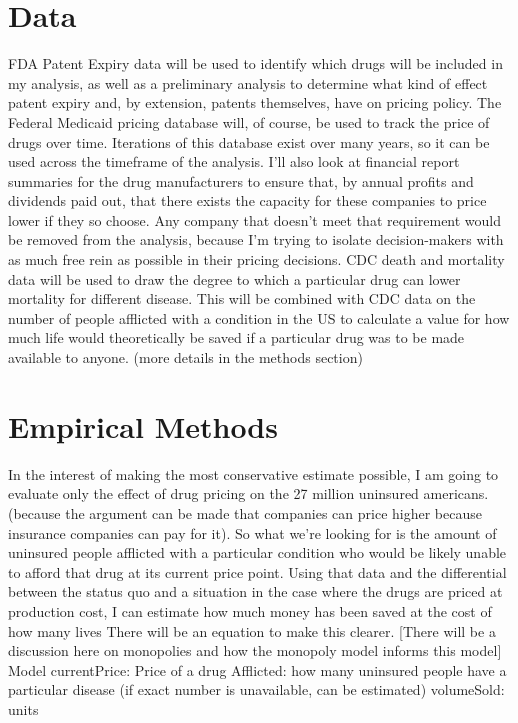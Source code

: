 \documentclass[12pt,english]{article} \usepackage{mathptmx}
\begin{document}
\section{Data}\label{sec:data} FDA Patent Expiry data will be used to 
identify which drugs will be included in my analysis, as well as a 
preliminary analysis to determine what kind of effect patent expiry 
and, by extension, patents themselves, have on pricing policy. The 
Federal Medicaid pricing database will, of course, be used to track 
the price of drugs over time. Iterations of this database exist over 
many years, so it can be used across the timeframe of the analysis. 
I'll also look at financial report summaries for the drug 
manufacturers to ensure that, by annual profits and dividends paid 
out, that there exists the capacity for these companies to price 
lower if they so choose. Any company that doesn't meet that 
requirement would be removed from the analysis, because I'm trying to 
isolate decision-makers with as much free rein as possible in their 
pricing decisions. CDC death and mortality data will be used to draw 
the degree to which a particular drug can lower mortality for 
different disease. This will be combined with CDC data on the number 
of people afflicted with a condition in the US to calculate a value 
for how much life would theoretically be saved if a particular drug 
was to be made available to anyone. (more details in the methods 
section) \section{Empirical Methods}\label{sec:methods} In the 
interest of making the most conservative estimate possible, I am 
going to evaluate only the effect of drug pricing on the 27 million 
uninsured americans. (because the argument can be made that companies 
can price higher because insurance companies can pay for it). So what 
we're looking for is the amount of uninsured people afflicted with a 
particular condition who would be likely unable to afford that drug 
at its current price point. Using that data and the differential 
between the status quo and a situation in the case where the drugs 
are priced at production cost, I can estimate how much money has been 
saved at the cost of how many lives There will be an equation to make 
this clearer. [There will be a discussion here on monopolies and how 
the monopoly model informs this model] Model currentPrice: Price of a 
drug Afflicted: how many uninsured people have a particular disease 
(if exact number is unavailable, can be estimated) volumeSold: units 
\end{document}
